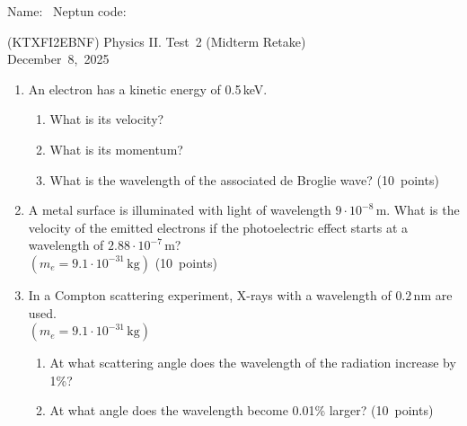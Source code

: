 \documentclass[12pt]{letter}
\begin{document}
Name: \hrulefill \ Neptun code: \hrulefill

\begin{center}
(KTXFI2EBNF) Physics II. Test~2 (Midterm Retake) \\
December~8,~2025 
\end{center}

\bigskip

\begin{enumerate}
\setcounter{enumi}{0} %

\item An electron has a kinetic energy of 0.5\,keV.
    \begin{enumerate}
        \item What is its velocity?
        \item What is its momentum?
        \item What is the wavelength of the associated de Broglie wave? \hfill (10~points)
    \end{enumerate}


\bigskip
\item A metal surface is illuminated with light of wavelength $9 \cdot 10^{-8}\,\text{m}$.  
  What is the velocity of the emitted electrons if the photoelectric effect starts at a wavelength of $2.88 \cdot 10^{-7}\,\text{m}$? \\ $(m_e = 9.1 \cdot 10^{-31}\,\text{kg})$  \hfill (10~points)


\bigskip
\item In a Compton scattering experiment, X-rays with a wavelength of $0.2\,\text{nm}$ are used. \\ $(m_e = 9.1 \cdot 10^{-31}\,\text{kg})$
    \begin{enumerate}
        \item At what scattering angle does the wavelength of the radiation increase by 1\%?
        \item At what angle does the wavelength become 0.01\% larger? \hfill (10~points)
    \end{enumerate}



\end{enumerate}
\end{document}
